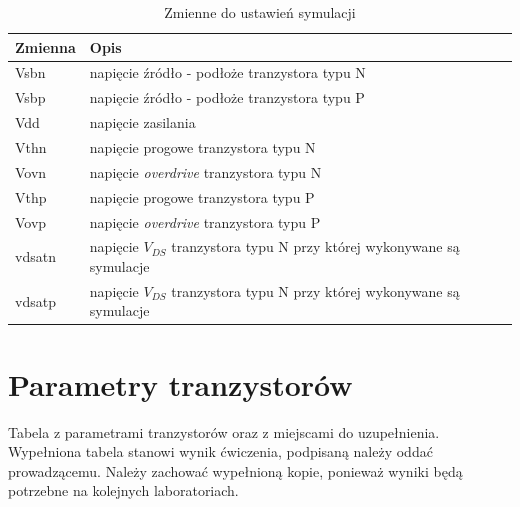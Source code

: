 \documentclass[twoside,pl,final]{labman}
\begin{document}
\begin{table}[htbp]
  \centering
  \caption{Zmienne do ustawień symulacji}
  \label{tab:measure:vars}
  \begin{tabular}{l l}
    \hline \hline
    Zmienna & Opis \\
    \hline
    Vsbn   & napięcie źródło - podłoże tranzystora typu N \\
    Vsbp   & napięcie źródło - podłoże tranzystora typu P \\
    Vdd    & napięcie zasilania \\
    Vthn   & napięcie progowe tranzystora typu N \\
    Vovn   & napięcie \emph{overdrive} tranzystora typu N \\
    Vthp   & napięcie progowe tranzystora typu P \\
    Vovp   & napięcie \emph{overdrive} tranzystora typu P \\
    vdsatn & napięcie $V_{DS}$ tranzystora typu N przy której wykonywane są symulacje \\
    vdsatp & napięcie $V_{DS}$ tranzystora typu N przy której wykonywane są symulacje \\
    \hline \hline
  \end{tabular}
\end{table}

\appendix
\chapter{Parametry tranzystorów}
\label{app:devices}

Tabela z parametrami tranzystorów oraz z miejscami do uzupełnienia.
Wypełniona tabela stanowi wynik ćwiczenia,
podpisaną należy oddać prowadzącemu.
Należy zachować wypełnioną kopie,
ponieważ wyniki będą potrzebne na kolejnych laboratoriach.
\end{document}
